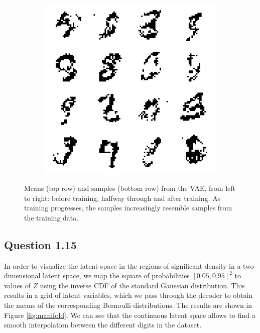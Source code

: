 \documentclass{article}
\begin{document}
\begin{figure}[t]
\begin{subfigure}{0.32\textwidth}
\includegraphics[scale=0.25]{img/vae_sample_40}
\end{subfigure}
 \caption{Means (top row) and samples (bottom row) from the VAE, from left to right: before training, halfway through and after training. As training progresses, the samples increasingly resemble samples from the training data.}
\label{fig:vae_samples}
\end{figure}

\subsection*{Question 1.15}

In order to visualize the latent space in the regions of significant density in a two-dimensional latent space, we map the square of probabilities $[0.05, 0.95]^2$ to values of $Z$ using the inverse CDF of the standard Gaussian distribution. This results in a grid of latent variables, which we pass through the decoder to obtain the means of the corresponding Bernoulli distributions. The results are shown in Figure \ref{fig:manifold}. We can see that the continuous latent space allows to find a smooth interpolation between the different digits in the dataset.
\end{document}
